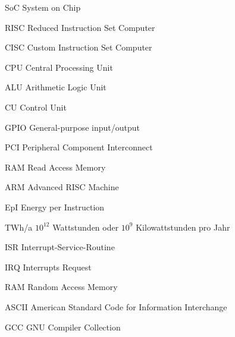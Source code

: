 \begin{abkuerzungen}[MUSTER] %
\item[SoC] System on Chip
\item[RISC] Reduced Instruction Set Computer
\item[CISC] Custom Instruction Set Computer
\item[CPU] Central Processing Unit
\item[ALU] Arithmetic Logic Unit
\item[CU] Control Unit
\item[GPIO] General-purpose input/output
\item[PCI] Peripheral Component Interconnect
\item[RAM] Read Access Memory
\item[ARM] Advanced RISC Machine
\item[EpI] Energy per Instruction
\item[TWh/a] $10^{12}$ Wattstunden oder $10^{9}$ Kilowattstunden pro Jahr
\item[ISR] Interrupt-Service-Routine
\item[IRQ] Interrupts Request
\item[RAM] Random Access Memory
\item[ASCII] American Standard Code for Information Interchange
\item[GCC] GNU Compiler Collection

\end{abkuerzungen}
